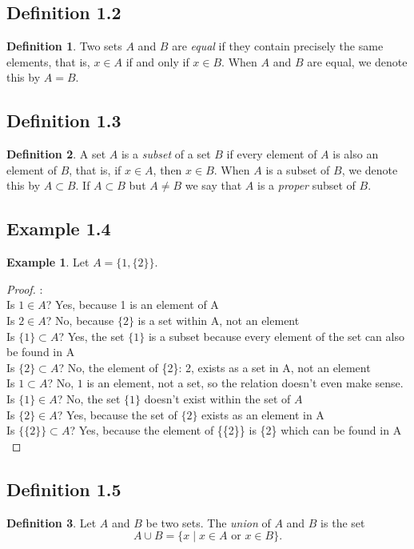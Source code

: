 \documentclass[openany, amssymb, psamsfonts]{amsart}
\theoremstyle{definition}
\newtheorem{defn}{Definition}[section]
\newtheorem{exmp}{Example}[section]
\numberwithin{equation}{section}
\begin{document}
\subsection{Definition 1.2}
\begin{defn}  
Two sets $A$ and $B$ are {\em equal} if they contain precisely the same elements, that is, $x\in A$
if and only if $x\in B$.  When $A$ and $B$ are equal, we denote this by $A=B$.
\end{defn}
\subsection{Definition 1.3}
\begin{defn}  
A set $A$ is a {\em subset} of a set $B$ if every element of $A$ is also an element of $B$, that is,
if $x\in A$, then $x\in B$.  When $A$ is a subset of $B$, we denote this by $A\subset B$.  If $A\subset B$ but $A\neq B$ 
we say that $A$ is a {\em proper} subset of $B.$ 
\end{defn}
\subsection{Example 1.4}
\begin{exmp} Let $A=\{1, \{2\}\}$.
\begin{proof}:\\
Is $1\in A$? Yes, because 1 is an element of A\\
Is $2\in A$? No, because $\{2\}$ is a set within A, not an element\\
Is $\{1\}\subset A$?  Yes, the set $\{1\}$ is a subset because every element of the set can also be found in A \\
Is $\{2\}\subset A$?  No, the element of \{2\}: 2, exists as a set in A, not an element \\
Is $1\subset A$?  No, $1$ is an element, not a set, so the relation doesn't even make sense. \\
Is $\{1\}\in A$?  No, the set $\{1\}$ doesn't exist within the set of $A$ \\
Is $\{2\}\in A$?   Yes, because the set of $\{2\}$ exists as an element in A\\
Is $\{\{2\}\}\subset A$? Yes, because the element of \{\{2\}\} is \{2\} which can be found in A \\
\end{proof}
\end{exmp}
\subsection{Definition 1.5}
\begin{defn}  Let $A$ and $B$ be two sets. 
The \emph{union} of $A$ and $B$ is the set
\[
A \cup B = \{x \mid \text{$x \in A$ or $x \in B$} \}.
\]
\end{defn}
\end{document}
